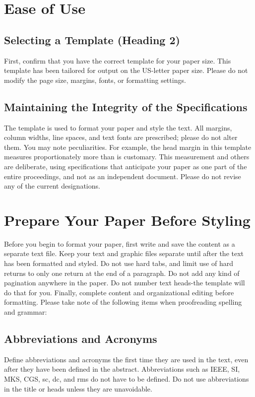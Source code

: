 \documentclass[conference, letterpaper]{IEEEtran}
\begin{document}
\section{Ease of Use}
\subsection{Selecting a Template (Heading 2)}
First, confirm that you have the correct template for your paper size. This template has been tailored for output on the US-letter paper size. Please do not modify the page size, margins, fonts, or formatting settings.

\subsection{Maintaining the Integrity of the Specifications}
The template is used to format your paper and style the text. All margins, column widths, line spaces, and text fonts are prescribed; please do not alter them. You may note peculiarities. For example, the head margin in this template measures proportionately more than is customary. This measurement and others are deliberate, using specifications that anticipate your paper as one part of the entire proceedings, and not as an independent document. Please do not revise any of the current designations.

\section{Prepare Your Paper Before Styling}
Before you begin to format your paper, first write and save the content as a separate text file. Keep your text and graphic files separate until after the text has been formatted and styled. Do not use hard tabs, and limit use of hard returns to only one return at the end of a paragraph. Do not add any kind of pagination anywhere in the paper. Do not number text heads-the template will do that for you. Finally, complete content and organizational editing before formatting. Please take note of the following items when proofreading spelling and grammar:

\subsection{Abbreviations and Acronyms}
Define abbreviations and acronyms the first time they are used in the text, even after they have been defined in the abstract. Abbreviations such as IEEE, SI, MKS, CGS, sc, dc, and rms do not have to be defined. Do not use abbreviations in the title or heads unless they are unavoidable.
\end{document}

